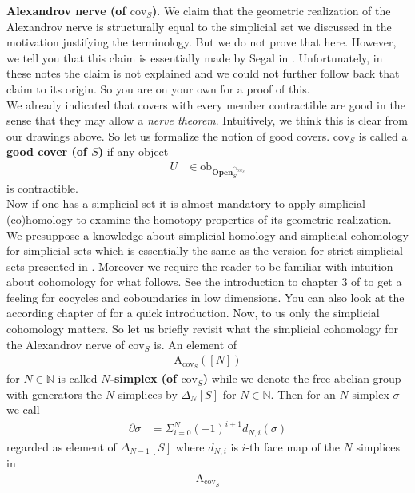 \textbf{Alexandrov nerve (of $\mathrm{cov}_{S}$)}. We claim that the geometric realization of the Alexandrov nerve is structurally equal to the simplicial set we discussed in the motivation justifying the terminology. But we do not prove that here. However, we tell you that this claim is essentially made by Segal in \cite{6d9ad807}. Unfortunately, in these notes the claim is not explained and we could not further follow back that claim to its origin. So you are on your own for a proof of this.
\\
We already indicated that covers with every member contractible are good in the sense that they may allow a \textit{nerve theorem}. Intuitively, we think this is clear from our drawings above. So let us formalize the notion of good covers. $\mathrm{cov}_{S}$ is called a \textbf{good cover (of $S$)} if any object
\begin{align*}
  U
  &\in
  \mathrm{ob}_{\mathbf{Open}_{S}^{\cap_{\mathrm{cov}_{S}}}}
\end{align*}
is contractible.
\\
Now if one has a simplicial set it is almost mandatory to apply simplicial (co)homology to examine the homotopy properties of its geometric realization. We presuppose a knowledge about simplicial homology and simplicial cohomology for simplicial sets which is essentially the same as the version for strict simplicial sets presented in \cite{8b5861fc}. Moreover we require the reader to be familiar with intuition about cohomology for what follows. See the introduction to chapter 3 of \cite{8b5861fc} to get a feeling for cocycles and coboundaries in low dimensions. You can also look at the according chapter of \cite{00000011} for a quick introduction. Now, to us only the simplicial cohomology matters. So let us briefly revisit what the simplicial cohomology for the Alexandrov nerve of $\mathrm{cov}_{S}$ is. An element of
\begin{align*}
  \mathrm{A}_{\mathrm{cov}_{S}}
  ([N])
\end{align*}
for $N \in \mathbb{N}$ is called \textbf{$N$-simplex (of $\mathrm{cov}_{S}$)} while we denote the free abelian group with generators the $N$-simplices by $\Delta_{N}[S]$ for $N \in \mathbb{N}$. Then for an $N$-simplex $\sigma$ we call
\begin{align*}
  \partial
  \sigma
  &=
  \Sigma_{i=0}^{N}
  (-1)^{i+1}
  d_{N,i}(\sigma)
\end{align*}
regarded as element of $\Delta_{N-1}[S]$ where $d_{N,i}$ is $i$-th face map of the $N$ simplices in
\begin{align*}
  \mathrm{A}_{\mathrm{cov}_{S}}
\end{align*}
